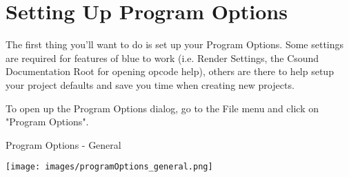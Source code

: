 \section{Setting Up Program Options}\label{programOptions}

The first thing you'll want to do is set up your Program Options. Some
settings are required for features of blue to work (i.e. Render
Settings, the Csound Documentation Root for opening opcode help), others
are there to help setup your project defaults and save you time when
creating new projects.

To open up the Program Options dialog, go to the File menu and click on
"Program Options".

Program Options - General

\texttt{[image: images/programOptions\_general.png]}

